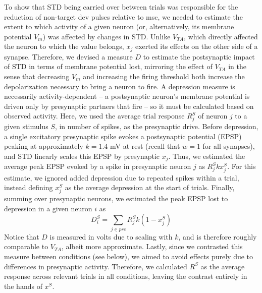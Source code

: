 \documentclass[pdflatex,referee,iicol,sn-basic]{sn-jnl}
\theoremstyle{thmstyleone}%
\theoremstyle{thmstyletwo}%
\theoremstyle{thmstylethree}%
\begin{document}
To show that STD being carried over between trials was responsible for the reduction of non-target dev pulses relative to msc, we needed to estimate the extent to which activity of a given neuron (or, alternatively, its membrane potential $V_m$) was affected by changes in STD. Unlike $V_{TA}$, which directly affected the neuron to which the value belongs, $x_j$ exerted its effects on the other side of a synapse. Therefore, we devised a measure $D$ to estimate the postsynaptic impact of STD in terms of membrane potential lost, mirroring the effect of $V_{TA}$ in the sense that decreasing $V_m$ and increasing the firing threshold both increase the depolarization necessary to bring a neuron to fire.
A depression measure is necessarily activity-dependent -- a postsynaptic neuron's membrane potential is driven only by presynaptic partners that fire -- so it must be calculated based on observed activity. Here, we used the average trial response $R_j^S$ of neuron $j$ to a given stimulus $S$, in number of spikes, as the presynaptic drive. Before depression, a single excitatory presynaptic spike evokes a postsynaptic potential (EPSP) peaking at approximately $k = 1.4$ mV at rest (recall that $w = 1$ for all synapses), and STD linearly scales this EPSP by presynaptic $x_j$. Thus, we estimated the average peak EPSP evoked by a spike in presynaptic neuron $j$ as $R_j^S k x_j^S$. For this estimate, we ignored added depression due to repeated spikes within a trial, instead defining $x_j^S$ as the average depression at the start of trials. Finally, summing over presynaptic neurons, we estimated the peak EPSP lost to depression in a given neuron $i$ as
\begin{equation}
    D_i^S = \sum_{j \in pre} R_j^S k (1-x_j^S)
\end{equation}
Notice that $D$ is measured in volts due to scaling with $k$, and is therefore roughly comparable to $V_{TA}$, albeit more approximate. Lastly, since we contrasted this measure between conditions (see below), we aimed to avoid effects purely due to differences in presynaptic activity. Therefore, we calculated $R^S$ as the average response across relevant trials in all conditions, leaving the contrast entirely in the hands of $x^S$.
\end{document}
